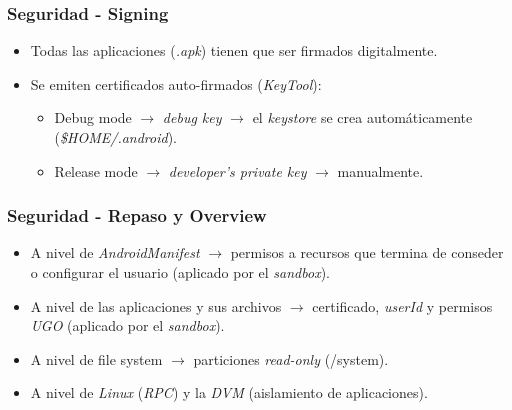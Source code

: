 \begin{frame}
  \frametitle{Seguridad - Signing}
  \begin{itemize}
    \item Todas las aplicaciones (\textit{.apk}) tienen que ser firmados digitalmente.

    \item Se emiten certificados auto-firmados (\textit{KeyTool}):
    \begin{itemize}
  \item Debug mode $\rightarrow$ \textit{debug key} $\rightarrow$ el \textit{keystore} se crea automáticamente (\textit{\$HOME/.android}).
  
  \item Release mode $\rightarrow$ \textit{developer's private key} $\rightarrow$ manualmente.
    \end{itemize}    
  \end{itemize}
\end{frame}

\begin{frame}
  \frametitle{Seguridad - Repaso y Overview}
  \begin{itemize}
   \item A nivel de \textit{AndroidManifest} $\rightarrow$ permisos a recursos que termina de conseder o configurar el usuario (aplicado por el \textit{sandbox}).
   
   \item A nivel de las aplicaciones y sus archivos $\rightarrow$ certificado, \textit{userId} y permisos \textit{UGO} (aplicado por el \textit{sandbox}).
   
   \item A nivel de file system $\rightarrow$ particiones \textit{read-only} (/system).
   
   \item A nivel de \textit{Linux} (\textit{RPC}) y la \textit{DVM} (aislamiento de aplicaciones).
  \end{itemize}
\end{frame}

